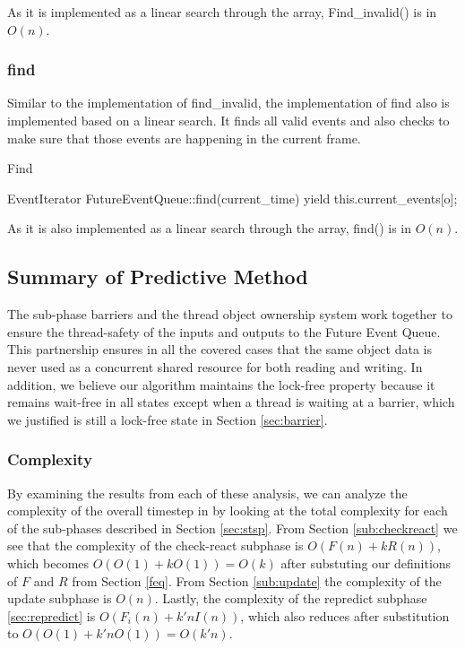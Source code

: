 \documentclass[CEJCS,PDF]{cej} %
\begin{document}
As it is implemented as a linear search through the array, Find\_invalid() is in $O(n)$.  


\subsubsection{find}

Similar to the implementation of find\_invalid, the implementation of find also is implemented based on a linear search.  It finds all valid events
and also checks to make sure that those events are happening in the current frame.

\begin{algorithm}
\caption{Find}
\begin{algorithmic}
\STATE EventIterator FutureEventQueue::find(current\_time)
		\STATE {}
		\STATE yield this.current\_events[o];
	\ENDIF
\ENDFOR
\end{algorithmic}
\end{algorithm}

As it is also implemented as a linear search through the array, find() is in $O(n)$.

\subsection{Summary of Predictive Method}
	The sub-phase barriers and the thread object ownership system work together to ensure the thread-safety of the inputs and outputs to the Future Event Queue.
This partnership ensures in all the covered cases that the same object data is never used as a concurrent shared resource for both reading and writing.  In addition, we believe our algorithm maintains
the lock-free property because it remains wait-free in all states except when a thread is waiting at a barrier, which we justified is still a lock-free state in Section \ref{sec:barrier}.

\subsubsection{Complexity}

By examining the results from each of these analysis, we can analyze the complexity of the overall timestep in by looking at the total complexity for each of the sub-phases described in Section \ref{sec:stsp}.
From Section \ref{sub:checkreact} we see that the complexity of the check-react subphase is $O(F(n)+k R(n))$, which becomes $O(O(1)+kO(1))=O(k)$ after substuting our definitions of $F$ and $R$ from Section \ref{feq}.
From Section \ref{sub:update} the complexity of the update subphase is $O(n)$.  
Lastly, the complexity of the repredict subphase \ref{sec:repredict} is $O(F_i(n)+k' n I(n))$, which also reduces after substitution to $O(O(1)+k' n O(1))=O(k'n)$.
\end{document}
